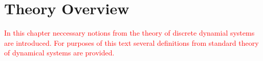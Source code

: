 \chapter{Theory Overview}

\textcolor{red}{
In this chapter neccessary notions from the theory of discrete dynamial systems are introduced.
For purposes of this text several definitions from standard theory of dynamical systems are provided.
}




\endinput